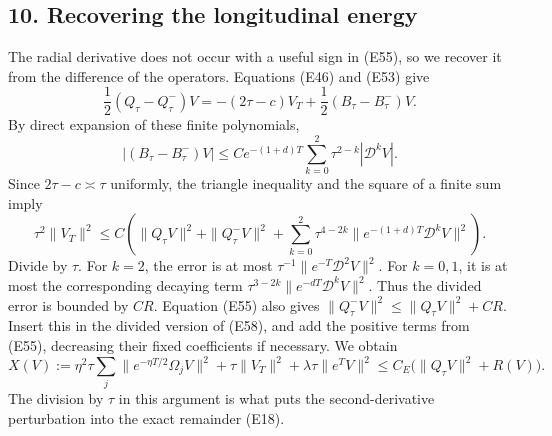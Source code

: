 \documentclass[
  11pt,
]{article}
\makeatletter
\let\ReaderOriginalAnchorStart\hyper@anchorstart
\let\ReaderOriginalAnchorEnd\hyper@anchorend
\let\ReaderPendingAliases\@empty
\def\ReaderArmAliases#1{\gdef\ReaderPendingAliases{#1}}
\def\hyper@anchorstart#1{\ReaderIfNativeAnchorTF{#1}{\ReaderPendingAliases\global\let\ReaderPendingAliases\@empty}{}\ReaderOriginalAnchorStart{#1}}
\makeatother
\begin{document}
\ReaderArmAliases{\ReaderOriginalAnchorStart{AN03-EXU-010}\ReaderOriginalAnchorEnd\begingroup\expandafter\def\csname @currentHref\endcsname{AN03-EXU-010}\label{AN03-EXU-010}\endgroup\ReaderOriginalAnchorStart{an03-exu-010-recovering-the-longitudinal-energy}\ReaderOriginalAnchorEnd\begingroup\expandafter\def\csname @currentHref\endcsname{an03-exu-010-recovering-the-longitudinal-energy}\label{an03-exu-010-recovering-the-longitudinal-energy}\endgroup\ReaderOriginalAnchorStart{10-recovering-the-longitudinal-energy}\ReaderOriginalAnchorEnd\begingroup\expandafter\def\csname @currentHref\endcsname{10-recovering-the-longitudinal-energy}\label{10-recovering-the-longitudinal-energy}\endgroup\ReaderOriginalAnchorStart{recovering-the-longitudinal-energy}\ReaderOriginalAnchorEnd}
\subsection{10. Recovering the longitudinal
energy}\label{recovering-the-longitudinal-energy}

The radial derivative does not occur with a useful sign in (E55), so we
recover it from the difference of the operators. Equations (E46) and
(E53) give \[
 \frac12(Q_\tau-Q_\tau^-)V
    =-(2\tau-c)V_T+\frac12(B_\tau-B_\tau^-)V.                   \tag{E56}
\] By direct expansion of these finite polynomials, \[
 |(B_\tau-B_\tau^-)V|
       \leq C e^{-(1+d)T}
                  \sum_{k=0}^2\tau^{2-k}|\mathcal D^kV|.        \tag{E57}
\] Since \(2\tau-c\asymp\tau\) uniformly, the triangle inequality and
the square of a finite sum imply \[
 \tau^2\|V_T\|^2\leq C\left(
     \|Q_\tau V\|^2+\|Q_\tau^-V\|^2
        +\sum_{k=0}^2\tau^{4-2k}
                    \|e^{-(1+d)T}\mathcal D^kV\|^2\right).     \tag{E58}
\] Divide by \(\tau\). For \(k=2\), the error is at most
\(\tau^{-1}\|e^{-T}\mathcal D^2V\|^2\). For \(k=0,1\), it is at most the
corresponding decaying term \(\tau^{3-2k}\|e^{-dT}\mathcal D^kV\|^2\).
Thus the divided error is bounded by \(CR\). Equation (E55) also gives
\(\|Q_\tau^-V\|^2\leq\|Q_\tau V\|^2+CR\). Insert this in the divided
version of (E58), and add the positive terms from (E55), decreasing
their fixed coefficients if necessary. We obtain \[
 X(V):=\eta^2\tau\sum_j\|e^{-\eta T/2}\Omega_jV\|^2
             +\tau\|V_T\|^2+\lambda\tau\|e^TV\|^2
                \leq C_E\bigl(\|Q_\tau V\|^2+R(V)\bigr).       \tag{E59}
\] The division by \(\tau\) in this argument is what puts the
second-derivative perturbation into the exact remainder (E18).
\end{document}
